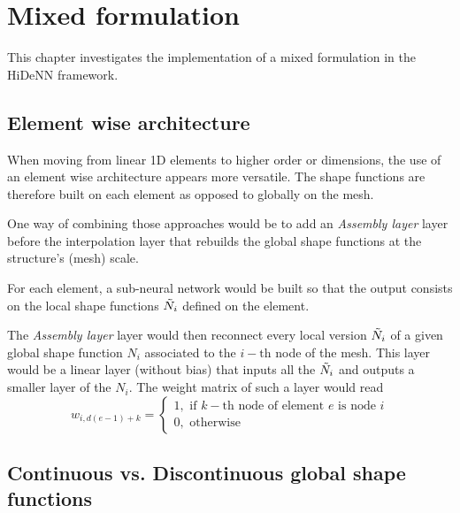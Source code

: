\chapter[Mixed Formulation]{Mixed formulation}
\label{chap:MixedFormulation}
\begin{chapabstract}
    This chapter investigates the implementation of a mixed formulation in the HiDeNN framework.
\end{chapabstract}

\minitoc

\section{Element wise architecture}

When moving from linear 1D elements to higher order or dimensions, the use of an element wise architecture appears more versatile. The shape functions are therefore built on each element as opposed to globally on the mesh. 

One way of combining those approaches would be to add an \emph{Assembly layer} layer before the interpolation layer that rebuilds the global shape functions at the structure's (mesh) scale.

For each element, a sub-neural network would be built so that the output consists on the local shape functions $\Tilde{N}_i$ defined on the element. 


The \emph{Assembly layer} layer would then reconnect every local version $\Tilde{N}_i$ of a given global shape function $N_i$ associated to the $i-\text{th}$ node of the mesh. This layer would be a linear layer (without bias) that inputs all the $\Tilde{N}_i$ and outputs a smaller layer of the $N_i$.
The weight matrix of such a layer would read
\begin{equation}
    w_{i,d\left(e-1\right)+k} = \begin{cases}
        1,\text{ if }k-\text{th node of element }e\text{ is node }i \\
        0,\text{ otherwise}
    \end{cases}
\end{equation}

\section{Continuous vs. Discontinuous global shape functions}

